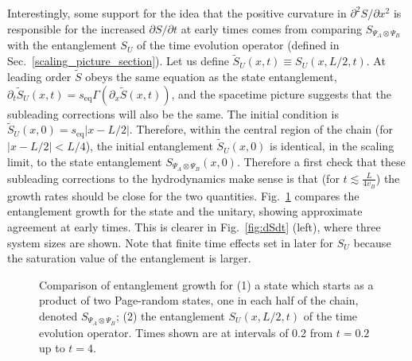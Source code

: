 \documentclass[aps,prx,twocolumn,superscriptaddress,floatfix,nofootinbib,prx]{revtex4}
\newcommand{\f}{\frac}
\renewcommand{\>}{\right\rangle}
\newcommand{\<}{\left\langle}
\newcommand{\lf}{\left(}
\newcommand{\ri}{\right)}
\newcommand{\seq}{s_\text{eq}}
\begin{document}
Interestingly, some support for the idea that the positive curvature in $\partial^2 S/\partial x^2$ is responsible for the increased $\partial S/\partial t$ at early times comes from comparing $S_{\Psi_A\otimes\Psi_B}$ with the entanglement $S_U$ of the time evolution operator (defined in Sec.~\ref{scaling_picture_section}). 
Let us define ${\widetilde S_U(x,t) \equiv S_U(x,L/2,t)}$.  At leading order $\widetilde S$ obeys the same equation as the state entanglement, ${\partial_t \widetilde S_U(x,t) = \seq \Gamma\lf \partial_x \widetilde S(x,t) \ri}$,
and the spacetime picture suggests that the subleading corrections will also be the same. The initial condition is $\widetilde S_U(x,0) = \seq |x-L/2|$. Therefore, within the central region of the chain (for ${|x-L/2|< L/4}$), the initial entanglement $\widetilde S_U(x,0)$ is identical, in the scaling limit, to the state entanglement $S_{\Psi_A\otimes\Psi_B}(x,0)$.  Therefore a first check that these subleading corrections to the hydrodynamics make sense is that  (for  $t\lesssim \f{L}{4 v_B}$) the growth rates should be close for the two quantities.
Fig.~\ref{fig:compareunitarystate} compares the entanglement growth for the state and the unitary, showing approximate agreement at early times. This is clearer in Fig.~\ref{fig:dSdt} (left), where three system sizes are shown. Note that finite time effects set in later for $S_U$ because the saturation value of the entanglement is larger.




\begin{figure}[t]
\caption{
Comparison of entanglement growth for (1) a state which starts as a product of two Page-random states, one in each half of the chain, denoted $S_{\Psi_A\otimes\Psi_B}$; (2) the entanglement $S_U(x,L/2,t)$ of the time evolution operator. Times shown are at intervals of 0.2 from $t=0.2$ up to $t=4$.
}  \label{fig:compareunitarystate}
\end{figure} 
\end{document}
